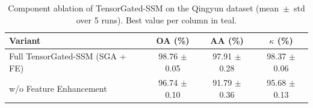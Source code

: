 \begin{table}[htbp]
  \centering
  \caption{Component ablation of TensorGated-SSM on the Qingyun dataset (mean~$\pm$~std over 5 runs). Best value per column in \textcolor{tgteal}{teal}.}
  \label{tab:ablation_qingyun}
  \begin{tabular}{l c c c}
    \toprule
    Variant & OA (\%) & AA (\%) & $\kappa$ (\%) \\
    \midrule
    Full TensorGated-SSM (SGA + FE) & \textcolor{tgteal}{98.76 $\pm$ 0.05} & \textcolor{tgteal}{97.91 $\pm$ 0.28} & \textcolor{tgteal}{98.37 $\pm$ 0.06} \\
    w/o Feature Enhancement & 96.74 $\pm$ 0.10 & 91.79 $\pm$ 0.36 & 95.68 $\pm$ 0.13 \\
    \bottomrule
  \end{tabular}
\end{table}
